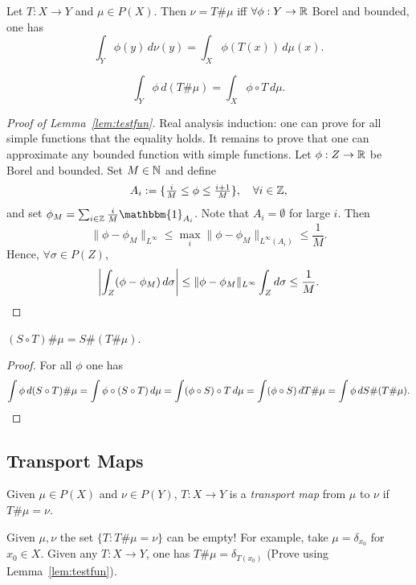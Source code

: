 \documentclass[oneside,leqno,11pt]{amsart}
\numberwithin{equation}{section}
\newcommand{\indic}{\mathbbm{1}}
\newcommand{\norm}[1]{\|#1\|}
\begin{document}
\begin{lemma}\label{lem:testfun}
    Let $T:X\to Y$ and $\mu\in P(X)$. Then $\nu = T\#\mu$ iff $\forall \phi:Y\to\mathbb{R}$ Borel and bounded, one has \[
        \int_Y \phi(y)\, d\nu(y) =  \int_X \phi(T(x))\,d\mu(x).
    \] 
\end{lemma}
\begin{corollary}
    \[
        \int_Y \phi\, d(T\#\mu) = \int_X \phi\circ T\, d\mu.
    \] 
\end{corollary}
\begin{proof}[Proof of Lemma~\ref{lem:testfun}]
    Real analysis induction: one can prove for all simple functions that the equality holds. It remains to prove that one can approximate any bounded function with simple functions. Let $\phi:Z\to \mathbb{R}$ be Borel and bounded. Set $M\in\mathbb{N}$ and define
    \[
        A_i := \{ \tfrac{i}{M} \leq \phi \leq \tfrac{i+1}{M} \}, \quad\forall i\in\mathbb{Z},
    \] 
    and set $\phi_M = \sum_{i \in \ZZ} \frac{i}{M} \indic_{A_i}$. Note that $A_i = \emptyset$ for large $i$. Then 
    \[
        \norm{\phi - \phi_M}_{L^\infty} \leq \max_i \norm{\phi - \phi_M}_{L^\infty(A_i)} \leq \frac{1}{M}.
    \] 
    Hence, $\forall\sigma\in P(Z)$, \[
        \left| \int_Z (\phi - \phi_M)\, d\sigma\right| \leq \norm{\phi - \phi_M}_{L^\infty}\int_Z d\sigma \leq \frac{1}{M}.\qedhere
    \] 
\end{proof}
\begin{lemma}
    $(S \circ T)\# \mu = S\#(T\#\mu)$.
\end{lemma}
\begin{proof}
    For all $\phi$ one has
    \[
        \int \phi\, d(S\circ T)\#\mu = \int \phi \circ (S \circ T)\, d\mu = \int (\phi \circ S) \circ T\, d\mu = \int (\phi \circ S)\,dT\#\mu = \int \phi\, dS\#(T\#\mu). \qedhere
    \] 
\end{proof}

\subsection{Transport Maps}
Given $\mu \in P(X)$ and $\nu \in P(Y)$, $T:X\to Y$ is a \emph{transport map} from $\mu$ to $\nu$ if $T\#\mu = \nu$. 
\begin{remark}
    Given $\mu, \nu$ the set $\{T:T\#\mu = \nu\}$ can be empty! For example, take $\mu = \delta_{x_0}$ for $x_0 \in X$. Given any $T:X\to Y$, one has $T\#\mu = \delta_{T(x_0)}$ (Prove using Lemma~\ref{lem:testfun}).
\end{remark}
\end{document}
